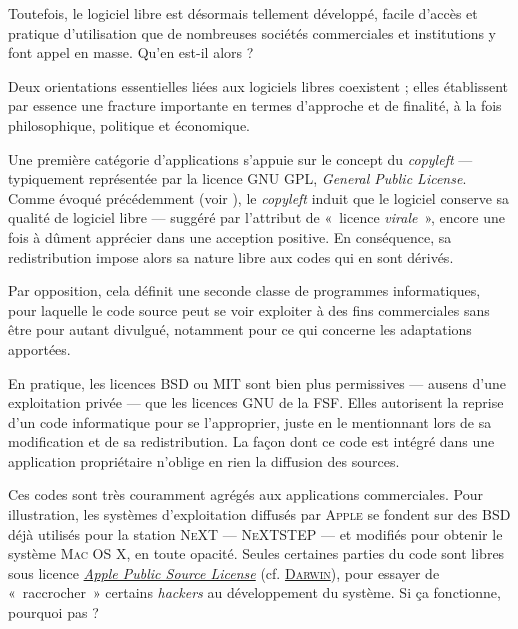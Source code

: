Toutefois, le logiciel libre est désormais tellement développé, facile d'accès et pratique d'utilisation que de nombreuses sociétés commerciales et institutions y font appel en masse. Qu'en est-il alors ?


Deux orientations essentielles liées aux logiciels libres coexistent ; elles établissent par essence une fracture importante en termes d'approche et de finalité, à la fois philosophique, politique et économique. 

Une première catégorie d'applications s'appuie sur le concept du \textit{copyleft} --- typiquement représentée par la licence GNU GPL, \textit{General Public License}. Comme évoqué précédemment (voir ), le \textit{copyleft} induit que le logiciel conserve sa qualité de logiciel libre --- suggéré par l'attribut de «~licence \emph{virale}~», encore une fois à dûment apprécier dans une acception positive. En conséquence, sa redistribution impose alors sa nature libre aux codes qui en sont dérivés. 

Par opposition, cela définit une seconde classe de programmes informatiques, pour laquelle le code source peut se voir exploiter à des fins commerciales sans être pour autant divulgué, notamment pour ce qui concerne les adaptations apportées.

En pratique, les licences BSD ou MIT sont bien plus permissives --- au\linebreak sens d'une exploitation privée --- que les licences GNU de la FSF. Elles autorisent la reprise d'un code informatique pour se l'approprier, juste en le mentionnant lors de sa modification et de sa redistribution. La fa\-çon dont ce code est intégré dans une application propriétaire n'oblige en rien la diffusion des sources.

Ces codes sont très couramment agrégés aux applications commerciales. Pour illustration, les systèmes d'exploitation diffusés par \textsc{Apple} se fondent sur des BSD déjà utilisés pour la station \textsc{NeXT} --- \textsc{NeXTSTEP} --- et modifiés pour obtenir le système \textsc{Mac OS X}, en toute opacité. Seules certaines parties du code sont libres sous licence \href{https://opensource.apple.com/apsl/}{\textit{Apple Public Source License}} (cf. \href{https://fr.wikipedia.org/wiki/Darwin_(informatique)}{\textsc{Darwin}}), pour essayer de «~raccrocher~» certains \textit{hackers} au développement du système. Si ça fonctionne, pourquoi
 pas ?

